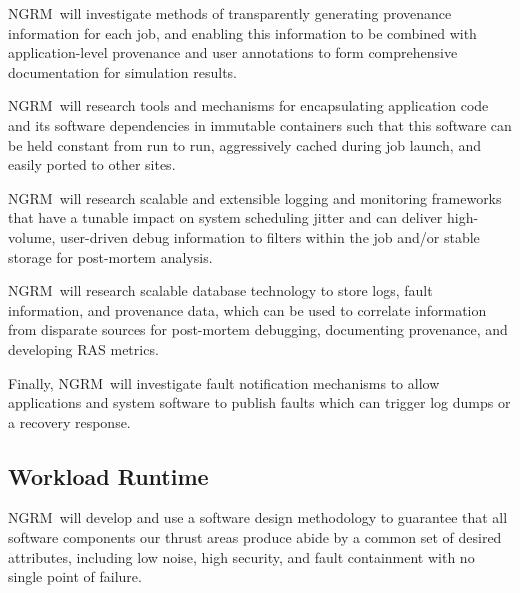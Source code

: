 \documentclass{article}
\newcommand{\ngrm}{NGRM}
\begin{document}
\ngrm\ will investigate methods of transparently generating provenance
information for each job, and enabling this information to be combined
with application-level provenance and user annotations to form
comprehensive documentation for simulation results.

\ngrm\ will research tools and mechanisms for encapsulating application
code and its software dependencies in immutable containers such that
this software can be held constant from run to run, aggressively
cached during job launch, and easily ported to other sites.

\ngrm\ will research scalable and extensible logging and monitoring
frameworks that have a tunable impact on system scheduling jitter and
can deliver high-volume, user-driven debug information to filters within
the job and/or stable storage for post-mortem analysis.

\ngrm\ will research scalable database technology to store
logs, fault information, and provenance data, which can be used
to correlate information from disparate sources for post-mortem debugging,
documenting provenance, and developing RAS metrics.

Finally, \ngrm\ will investigate fault notification mechanisms
to allow applications and system software to publish
faults which can trigger log dumps or a recovery response.


\subsection{Workload Runtime}

\ngrm\ will develop and use a software design methodology to
guarantee that all software components our thrust areas produce
abide by a common set of desired attributes, including low noise,
high security, and fault containment with no single point of failure.













\appendix







\end{document}
